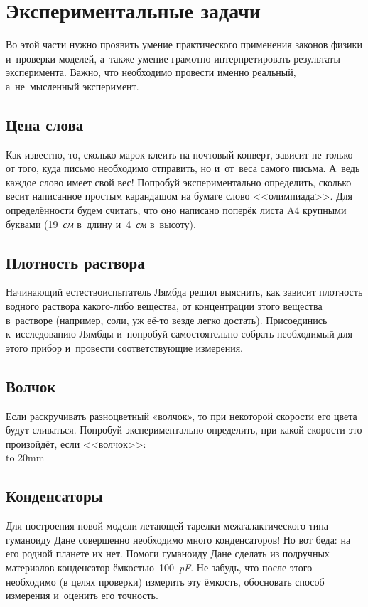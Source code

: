 \documentclass[a4paper,12pt]{article}
\begin{document}
\newpage

\section{Экспериментальные задачи}

Во этой части нужно проявить умение практического применения законов физики
и~проверки моделей, а~также умение грамотно интерпретировать результаты
эксперимента. Важно, что необходимо провести именно реальный,
а~не~мысленный эксперимент.

\subsection{Цена слова}
Как известно, то, сколько марок клеить на почтовый конверт, зависит не только от того,
куда письмо необходимо отправить, но и~от~веса самого письма. А~ведь каждое слово имеет
свой вес! Попробуй экспериментально определить, сколько весит написанное простым
карандашом на бумаге слово <<олимпиада>>. Для определённости будем считать, что
оно написано поперёк листа A4 крупными буквами (19~\emph{см} в~длину и~4~\emph{см} в~высоту).

\subsection{Плотность раствора}
Начинающий естествоиспытатель Лямбда решил выяснить, как зависит плотность
водного раствора какого-либо вещества, от концентрации этого вещества
в~растворе (например, соли, уж её-то везде легко достать). Присоединись
к~исследованию Лямбды и~попробуй самостоятельно собрать необходимый
для этого прибор и~провести соответствующие измерения.

\subsection{Волчок}
Если раскручивать разноцветный «волчок», то при некоторой скорости его цвета будут сливаться.
Попробуй экспериментально определить, при какой скорости это произойдёт, если <<волчок>>:\\
\vbox to 20mm{
\vss
{}
\vss}

\subsection{Конденсаторы}
Для построения новой модели летающей тарелки межгалактического типа гуманоиду Дане
совершенно необходимо много конденсаторов! Но вот беда: на его родной планете их нет.
Помоги гуманоиду Дане сделать из подручных материалов конденсатор ёмкостью~100~\emph{pF}.
Не забудь, что после этого необходимо (в  целях проверки) измерить эту ёмкость,
обосновать способ измерения и~оценить его точность.
\end{document}
